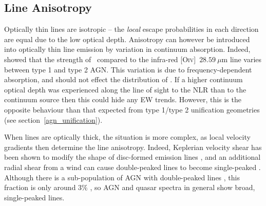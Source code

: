 \subsection{Line Anisotropy}
\label{sec:line_aniso}

Optically thin lines are isotropic -- the {\em local}
escape probabilities in each direction are equal due to the 
low optical depth. Anisotropy can however be introduced into optically thin 
line emission by variation in continuum absorption. Indeed,
\cite{kraemer2011} showed that the strength of \oiiifull\ compared
to the infra-red [O\textsc{iv}]~$28.59~\mu$m line 
varies between type 1 and type 2 AGN. This variation is due 
to frequency-dependent absorption, and should not effect the distribution of \ewo.
If a higher continuum optical depth was experienced along the line of sight
to the NLR than to the continuum source then this could hide any EW
trends. However, this is the opposite behaviour than that expected from type 1/type 2
unification geometries (see section~\ref{agn_unification}).

When lines are optically thick, the situation is more
complex, as local velocity gradients then determine the line 
anisotropy. Indeed, Keplerian velocity shear has been shown to modify the
shape of disc-formed emission lines \citep{hornemarsh1986}, and an additional
radial shear from a wind can cause double-peaked lines
to become single-peaked \citep{MC96,MC97,flohic2012}. 
Although there is a sub-population of AGN with double-peaked lines 
\citep[e.g.][]{eracleous1994,eracleous2003},
this fraction is only around $3\%$ \citep{strateva2003}, so
AGN and quasar spectra in general show broad, single-peaked lines. 

